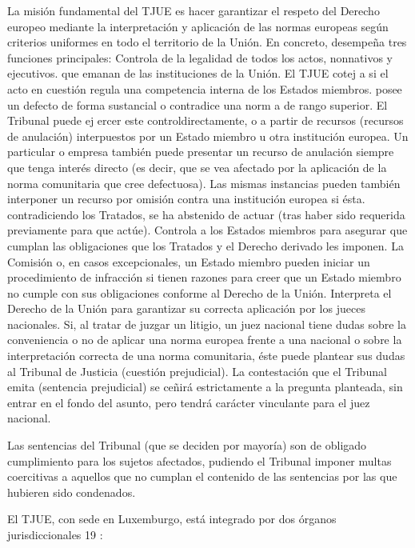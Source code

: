 \documentclass[10pt,a4paper]{article}
\begin{document}
La misión fundamental del TJUE es hacer garantizar el respeto del Derecho europeo mediante la interpretación y aplicación de las normas europeas según criterios uniformes en todo el territorio de la Unión. En concreto, desempeña tres funciones principales: Controla de la legalidad de todos los actos, nonnativos y ejecutivos. que emanan de las instituciones de la Unión. El TJUE cotej a si el acto en cuestión regula una competencia interna de los Estados miembros. posee un defecto de forma sustancial o contradice una norm a de rango superior. El Tribunal puede ej ercer este controldirectamente, o a partir de recursos (recursos de anulación) interpuestos por un Estado miembro u otra institución europea. Un particular o empresa también puede presentar un recurso de anulación siempre que tenga interés directo (es decir, que se vea afectado por la aplicación de la norma comunitaria que cree defectuosa). Las mismas instancias pueden también interponer un recurso por omisión contra una institución europea si ésta. contradiciendo los Tratados, se ha abstenido de actuar (tras haber sido requerida previamente para que actúe). Controla a los Estados miembros para asegurar que cumplan las obligaciones que los Tratados y el Derecho derivado les imponen. La Comisión o, en casos excepcionales, un Estado miembro pueden iniciar un procedimiento de infracción si tienen razones para creer que un Estado miembro no cumple con sus obligaciones conforme al Derecho de la Unión. Interpreta el Derecho de la Unión para garantizar su correcta aplicación por los jueces nacionales. Si, al tratar de juzgar un litigio, un juez nacional tiene dudas sobre la conveniencia o no de aplicar una norma europea frente a una nacional o sobre la interpretación correcta de una norma comunitaria, éste puede plantear sus dudas al Tribunal de Justicia (cuestión prejudicial). La contestación que el Tribunal emita (sentencia prejudicial) se ceñirá estrictamente a la pregunta planteada, sin entrar en el fondo del asunto, pero tendrá carácter vinculante para el juez nacional.

Las sentencias del Tribunal (que se deciden por mayoría) son de obligado cumplimiento para los sujetos afectados, pudiendo el Tribunal imponer multas coercitivas a aquellos que no cumplan el contenido de las sentencias por las que hubieren sido condenados.

El TJUE, con sede en Luxemburgo, está integrado por dos órganos jurisdiccionales 19 :
\end{document}
